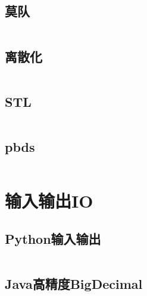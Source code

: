 \documentclass[twoside,sub3section,UTF8]{ctexart}						%
\begin{document}
	\subsection{莫队}
	\inputminted{c++}{"Other/Mos.cpp"}
	\subsection{离散化}
	\inputminted{c++}{"Other/discretization.cpp"}
	\subsection{STL}
	\inputminted{c++}{"Other/STL.cpp"}
	\subsection{pbds}
	\inputminted{c++}{"Other/pbds.cpp"}

\newpage
\section{输入输出IO}
	\subsection{Python输入输出}
		\inputminted{python}{"IO/IO.py"}
	\subsection{Java高精度BigDecimal}
		\inputminted{java}{"IO/IO.java"}
\end{document}

